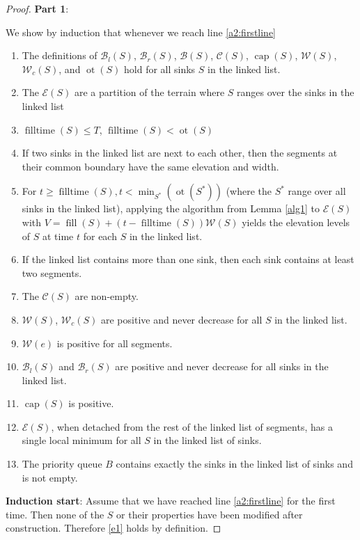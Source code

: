 \documentclass[11pt,a4paper]{article}
\DeclareMathOperator{\capp}{cap}
\DeclareMathOperator{\ot}{ot}
\DeclareMathOperator{\Fill}{fill}
\DeclareMathOperator{\filltime}{filltime}
\begin{document}
\begin{proof}
\textbf{Part 1}:

We show by induction that whenever we reach line \ref{a2:firstline}
\begin{enumerate}[label=\textbf{\Roman*}]
\item The definitions of $\mathcal{B}_l(S)$, $\mathcal{B}_r(S)$, $\mathcal{B}(S)$, $\mathcal{C}(S)$, $\capp(S)$, $\mathcal{W}(S)$, $\mathcal{W}_c(S)$, and $\ot(S)$ hold for all sinks $S$ in the linked list.\label{e1}
\item The $\mathcal{E}(S)$ are a partition of the terrain where $S$ ranges over the sinks in the linked list\label{e2}
\item $\filltime(S) \le T$, $\filltime(S) < \ot(S)$\label{e3}
\item If two sinks in the linked list are next to each other, then the segments at their common boundary have the same elevation and width.\label{e4} 
\item For $t\ge\filltime(S), t<\min_{S^*}(\ot(S^*))$ (where the $S^*$ range over all sinks in the linked list), applying the algorithm from Lemma \ref{alg1} to $\mathcal{E}(S)$ with $V = \Fill(S) + (t - \filltime(S))\mathcal{W}(S)$ yields the elevation levels of $S$ at time $t$ for each $S$ in the linked list.\label{e5}
\item If the linked list contains more than one sink, then each sink contains at least two segments.\label{e6}
\item The $\mathcal{C}(S)$ are non-empty.\label{e7}
\item $\mathcal{W}(S)$, $\mathcal{W}_c(S)$ are positive and never decrease for all $S$ in the linked list.\label{e8}
\item $\mathcal{W}(e)$ is positive for all segments.\label{e9}
\item $\mathcal{B}_l(S)$ and $\mathcal{B}_r(S)$ are positive and never decrease for all sinks in the linked list.\label{e10}
\item $\capp(S)$ is positive.\label{e11}
\item $\mathcal{E}(S)$, when detached from the rest of the linked list of segments, has a single local minimum for all $S$ in the linked list of sinks.\label{e12}
\item The priority queue $B$ contains exactly the sinks in the linked list of sinks and is not empty.\label{e13}
\end{enumerate}

\textbf{Induction start}: Assume that we have reached line \ref{a2:firstline} for the first time.
Then none of the $S$ or their properties have been modified after construction.
Therefore \ref{e1} holds by definition.


\end{proof}
\end{document}
